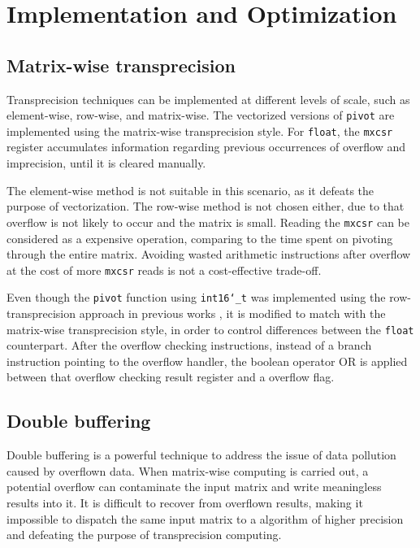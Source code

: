 \documentclass[logo,bsc,singlespacing,parskip]{infthesis}
\newcommand{\dtshort}{\texttt{int16\char`_t}}
\newcommand{\dtfloat}{\texttt{float}}
\newcommand{\mxcsr}{\texttt{mxcsr}}
\newcommand{\pivot}{\texttt{pivot}}
\begin{document}
\section{Implementation and Optimization}

\subsection{Matrix-wise transprecision}
Transprecision techniques can be implemented at different levels of scale, such
as element-wise, row-wise, and matrix-wise. The vectorized versions of \pivot{}
are implemented using the matrix-wise transprecision style. For \dtfloat{},
the \mxcsr{} register accumulates information regarding previous occurrences of
overflow and imprecision, until it is cleared manually. 

The element-wise method is not suitable in this scenario, as it defeats the
purpose of vectorization. The row-wise method is not chosen either, due to that
overflow is not likely to occur and the matrix is small. Reading the \mxcsr{}
can be considered as a expensive operation, comparing to the time spent on
pivoting through the entire matrix. Avoiding wasted arithmetic instructions
after overflow at the cost of more \mxcsr{} reads is not a cost-effective
trade-off.

Even though the \pivot{} function using \dtshort{} was implemented using the
row-transprecision approach in previous works \cite{FPL2}, it is modified to
match with the matrix-wise transprecision style, in order to control differences
between the \dtfloat{} counterpart. After the overflow checking instructions,
instead of a branch instruction pointing to the overflow handler, the boolean
operator OR is applied between that overflow checking result register and a
overflow flag. 


\subsection{Double buffering}

Double buffering is a powerful technique to address the issue of data pollution
caused by overflown data. When matrix-wise computing is carried out, a potential
overflow can contaminate the input matrix and write meaningless results into it.
It is difficult to recover from overflown results, making it impossible to
dispatch the same input matrix to a algorithm of higher precision and defeating
the purpose of transprecision computing.
\end{document}
